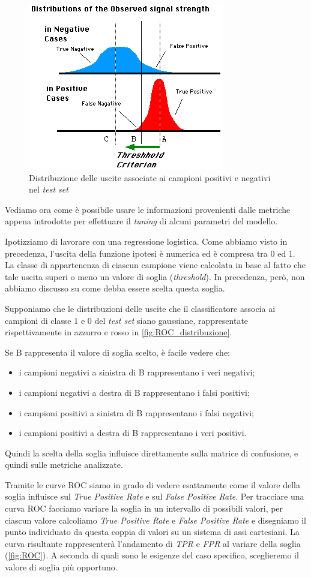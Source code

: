 \begin{figure}[tbp]
\centering
  \includegraphics[width=0.5 \textwidth]{images/ROC_distribuzione}
  \caption{Distribuzione delle uscite associate ai campioni positivi e negativi nel \emph{test set}}
  \label{fig:ROC_distribuzione}
\end{figure} 
Vediamo ora come è possibile usare le informazioni provenienti dalle metriche appena introdotte per effettuare il \emph{tuning} di alcuni parametri del modello. 

Ipotizziamo di lavorare con una regressione logistica. Come abbiamo visto in precedenza, l'uscita della funzione ipotesi è numerica ed è compresa tra 0 ed 1. La classe di appartenenza di ciascun campione viene calcolata in base al fatto che tale uscita superi o meno un valore di soglia (\emph{threshold}). In precedenza, però, non abbiamo discusso su come debba essere scelta questa soglia.

Supponiamo che le distribuzioni delle uscite che il classificatore associa ai campioni di classe $1$ e $0$ del \emph{test set} siano gaussiane, rappresentate rispettivamente in azzurro e rosso in \autoref{fig:ROC_distribuzione}.


Se B rappresenta il valore di soglia scelto, è facile vedere che:
\begin{itemize}
\item i campioni negativi a sinistra di B rappresentano i veri negativi;
\item i campioni negativi a destra di B rappresentano i falsi positivi;
\item i campioni positivi a sinistra di B rappresentano i falsi negativi;
\item i campioni positivi a destra di B rappresentano i veri positivi.
\end{itemize}
Quindi la scelta della soglia influisce direttamente sulla matrice di confusione, e quindi sulle metriche analizzate. 

Tramite le curve ROC siamo in grado di vedere esattamente come il valore della soglia influisce sul \emph{True Positive Rate} e sul \emph{False Positive Rate}. Per tracciare una curva ROC facciamo variare la soglia in un intervallo di possibili valori, per ciascun valore calcoliamo \emph{True Positive Rate} e \emph{False Positive Rate} e disegniamo il punto individuato da questa coppia di valori su un sistema di assi cartesiani. La curva risultante rappresenterà l'andamento di \emph{TPR} e \emph{FPR} al variare della soglia (\autoref{fig:ROC}). A seconda di quali sono le esigenze del caso specifico, sceglieremo il valore di soglia più opportuno.

